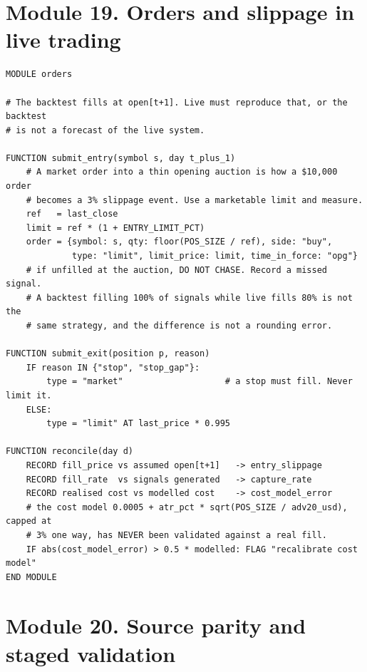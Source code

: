 \documentclass[10pt]{article}
\begin{document}
\section{Module 19. Orders and slippage in live trading}

\begin{lstlisting}
MODULE orders

# The backtest fills at open[t+1]. Live must reproduce that, or the backtest
# is not a forecast of the live system.

FUNCTION submit_entry(symbol s, day t_plus_1)
    # A market order into a thin opening auction is how a $10,000 order
    # becomes a 3% slippage event. Use a marketable limit and measure.
    ref   = last_close
    limit = ref * (1 + ENTRY_LIMIT_PCT)
    order = {symbol: s, qty: floor(POS_SIZE / ref), side: "buy",
             type: "limit", limit_price: limit, time_in_force: "opg"}
    # if unfilled at the auction, DO NOT CHASE. Record a missed signal.
    # A backtest filling 100% of signals while live fills 80% is not the
    # same strategy, and the difference is not a rounding error.

FUNCTION submit_exit(position p, reason)
    IF reason IN {"stop", "stop_gap"}:
        type = "market"                    # a stop must fill. Never limit it.
    ELSE:
        type = "limit" AT last_price * 0.995

FUNCTION reconcile(day d)
    RECORD fill_price vs assumed open[t+1]   -> entry_slippage
    RECORD fill_rate  vs signals generated   -> capture_rate
    RECORD realised cost vs modelled cost    -> cost_model_error
    # the cost model 0.0005 + atr_pct * sqrt(POS_SIZE / adv20_usd), capped at
    # 3% one way, has NEVER been validated against a real fill.
    IF abs(cost_model_error) > 0.5 * modelled: FLAG "recalibrate cost model"
END MODULE
\end{lstlisting}

\section{Module 20. Source parity and staged validation}
\end{document}
